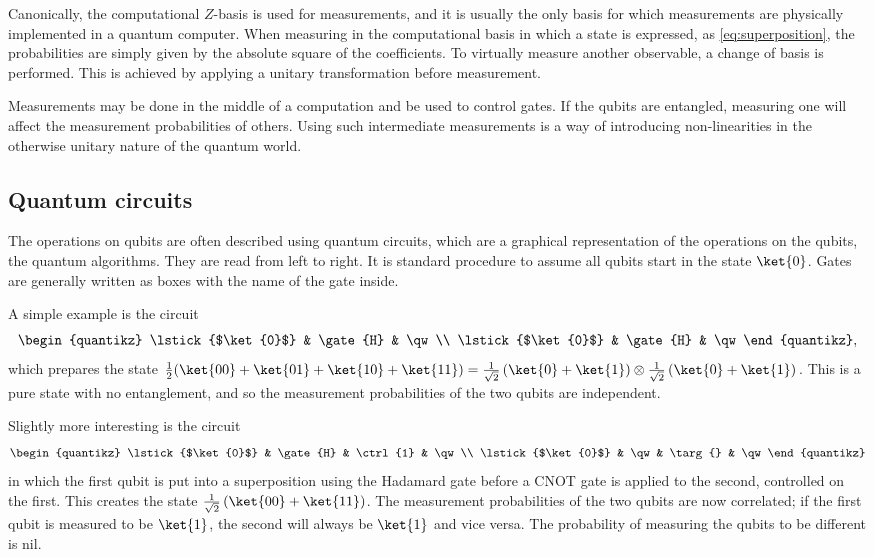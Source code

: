 Canonically, the computational $Z$-basis is used for measurements, and it is usually the only basis for which measurements are physically implemented in a quantum computer.
When measuring in the computational basis in which a state is expressed, as \cref{eq:superposition}, the probabilities are simply given by the absolute square of the coefficients.
To virtually measure another observable, a change of basis is performed.
This is achieved by applying a unitary transformation before measurement.

Measurements may be done in the middle of a computation and be used to control gates.
If the qubits are entangled, measuring one will affect the measurement probabilities of others.
Using such intermediate measurements is a way of introducing non-linearities in the otherwise unitary nature of the quantum world.

\subsection{Quantum circuits}
The operations on qubits are often described using quantum circuits, which are a graphical representation of the operations on the qubits, the quantum algorithms.
They are read from left to right.
It is standard procedure to assume all qubits start in the state $\ket{0}$.
Gates are generally written as boxes with the name of the gate inside.

A simple example is the circuit
\begin{equation}
    \begin{quantikz}
        \lstick{$\ket{0}$} & \gate{H} & \qw \\
        \lstick{$\ket{0}$} & \gate{H} & \qw
    \end{quantikz},
\end{equation}
which prepares the state
$
    \frac{1}{2}(\ket{00} + \ket{01} + \ket{10} + \ket{11})
    =
    \frac{1}{\sqrt{2}}
    \left(
    \ket{0} + \ket{1}
    \right)
    \otimes
    \frac{1}{\sqrt{2}}
    \left(
    \ket{0} + \ket{1}
    \right)
$.
This is a pure state with no entanglement, and so the measurement probabilities of the two qubits are independent.

Slightly more interesting is the circuit
\begin{equation}
    \begin{quantikz}
        \lstick{$\ket{0}$} & \gate{H} & \ctrl{1} & \qw \\
        \lstick{$\ket{0}$} & \qw & \targ{} & \qw
    \end{quantikz}
\end{equation}
in which the first qubit is put into a superposition using the Hadamard gate before a CNOT gate is applied to the second, controlled on the first.
This creates the state $\frac{1}{\sqrt{2}}\left(\ket{00} + \ket{11}\right)$.
The measurement probabilities of the two qubits are now correlated; if the first qubit is measured to be $\ket{1}$, the second will always be $\ket{1}$ and vice versa.
The probability of measuring the qubits to be different is nil.

